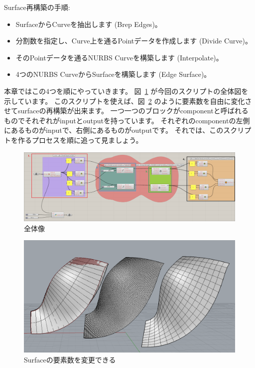 \documentclass[11pt]{jarticle}
\begin{document}
\noindent Surface再構築の手順: 
\begin{itemize}
\item
[1. ]SurfaceからCurveを抽出します (Brep Edges)。
\item
[2. ]分割数を指定し、Curve上を通るPointデータを作成します (Divide Curve)。
\item
[3. ]そのPointデータを通るNURBS Curveを構築します (Interpolate)。
\item
[4. ]4つのNURBS CurveからSurfaceを構築します (Edge Surface)。
\end{itemize}
本章ではこの4つを順にやっていきます。
図~\ref{fig:all} が今回のスクリプトの全体図を示しています。
このスクリプトを使えば、図~\ref{fig:surface} のように要素数を自由に変化させてsurfaceの再構築が出来ます。
一つ一つのブロックがcomponentと呼ばれるものでそれぞれがinputとoutputを持っています。
それぞれのcomponentの左側にあるものがinputで、右側にあるものがoutputです。
それでは、このスクリプトを作るプロセスを順に追って見ましょう。
%
\begin{figure}[H]
  \centering
    \includegraphics[width=\linewidth]{fig/gh_prog.png}
    \caption{全体像}
    \label{fig:all}
\end{figure}
%
\begin{figure}[H]
  \centering
    \includegraphics[width=\linewidth]{fig/finpng.png}
    \caption{Surfaceの要素数を変更できる}
    \label{fig:surface}
\end{figure}
\end{document}
